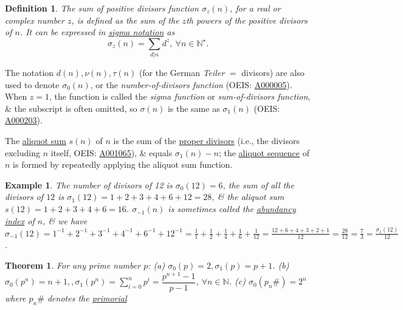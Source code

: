 \documentclass{article}
\newtheorem{definition}{Definition}
\newtheorem{example}{Example}
\newtheorem{theorem}{Theorem}
\begin{document}
\begin{definition}
	The {\rm sum of positive divisors function} $\sigma_z(n)$, for a real or complex number $z$, is defined as the sum of the $z$th powers of the positive divisors of $n$. It can be expressed in \href{https://en.wikipedia.org/wiki/Summation#Capital-sigma_notation}{sigma notation} as
	\begin{equation*}
		\sigma_z(n) = \sum_{d|n} d^z,\ \forall n\in\mathbb{N}^\star.
	\end{equation*}
\end{definition}
The notation $d(n),\nu(n),\tau(n)$ (for the German {\it Teiler} $=$ divisors) are also used to denote $\sigma_0(n)$, or the {\it number-of-divisors function} (OEIS: \href{https://oeis.org/A000005}{A000005}). When $z = 1$, the function is called the {\it sigma function} or {\it sum-of-divisors function}, \& the subscript is often omitted, so $\sigma(n)$ is the same as $\sigma_1(n)$ (OEIS: \href{https://oeis.org/A000203}{A000203}).

The \href{https://en.wikipedia.org/wiki/Aliquot_sum}{aliquot sum} $s(n)$ of $n$ is the sum of the \href{https://en.wikipedia.org/wiki/Proper_divisor}{proper divisors} (i.e., the divisors excluding $n$ itself, OEIS: \href{https://oeis.org/A001065}{A001065}), \& equals $\sigma_1(n) - n$; the \href{https://en.wikipedia.org/wiki/Aliquot_sequence}{aliquot sequence} of $n$ is formed by repeatedly applying the aliquot sum function.

\begin{example}
	The number of divisors of 12 is $\sigma_0(12) = 6$, the sum of all the divisors of $12$ is $\sigma_1(12) = 1 + 2 + 3 + 4 + 6 + 12 = 28$, \& the aliquot sum $s(12) = 1 + 2 + 3 + 4 + 6 = 16$. $\sigma_{-1}(n)$ is sometimes called the \href{https://en.wikipedia.org/wiki/Abundancy_index}{abundancy index} of $n$, \& we have $\sigma_{-1}
	(12) = 1^{-1} + 2^{-1} + 3^{-1} + 4^{-1} + 6^{-1} + 12^{-1} = \frac{1}{1} + \frac{1}{2} + \frac{1}{4} + \frac{1}{6} + \frac{1}{12} = \frac{12 + 6 + 4 + 3 + 2 + 1}{12} = \frac{28}{12} = \frac{7}{3} = \frac{\sigma_1(12)}{12}$. 
\end{example}

\begin{theorem}
	For any prime number $p$: (a) $\sigma_0(p) = 2,\sigma_1(p) = p + 1$. (b) $\sigma_0(p^n) = n + 1,,\sigma_1(p^n) = \sum_{i=0}^n p^i = \dfrac{p^{n+1} - 1}{p - 1}$, $\forall n\in\mathbb{N}$. (c) $\sigma_0(p_n\#) = 2^n$ where $p_n\#$ denotes the \href{https://en.wikipedia.org/wiki/Primorial}{primorial}
\end{theorem}
\end{document}
